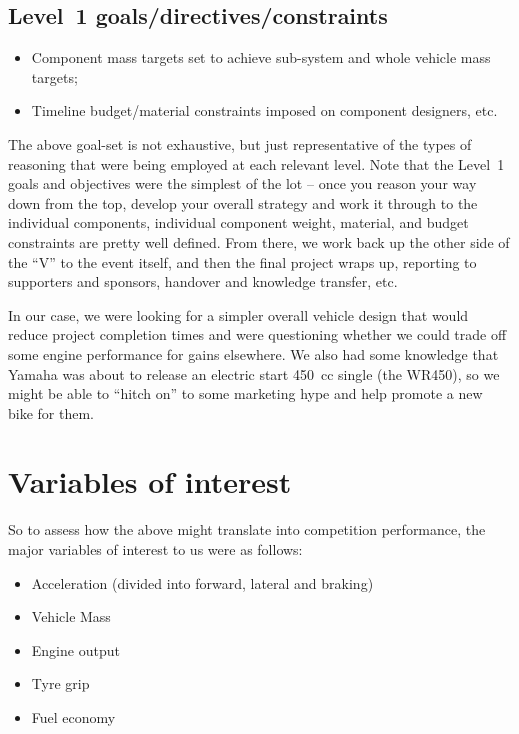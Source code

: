 \documentclass[10pt, a4paper, article, oneside, twocolumn, final]{memoir}
\begin{document}
\subsection*{Level~1 goals/\allowbreak directives/\allowbreak constraints}
\begin{itemize}
    \item Component mass targets set to achieve sub-system and whole vehicle mass targets;
    \item Timeline budget/\allowbreak material constraints imposed on component designers, etc. 
\end{itemize}

The above goal-set is not exhaustive, but just representative of the types of reasoning that were being employed at each relevant level. Note that the Level~1 goals and objectives were the simplest of the lot -- once you reason your way down from the top, develop your overall strategy and work it through to the individual components, individual component weight, material, and budget constraints are pretty well defined. From there, we work back up the other side of the “V” to the event itself, and then the final project wraps up, reporting to supporters and sponsors, handover and knowledge transfer, etc. 

In our case, we were looking for a simpler overall vehicle design that would reduce project completion times and were questioning whether we could trade off some engine performance for gains elsewhere. We also had some knowledge that Yamaha was about to release an electric start \SI{450}{cc} single (the WR450), so we might be able to “hitch on” to some marketing hype and help promote a new bike for them. 

\section*{Variables of interest}

So to assess how the above might translate into competition performance, the major variables of interest to us were as follows: 

\begin{itemize}
    \item Acceleration (divided into forward, lateral and braking)
    \item Vehicle Mass
    \item Engine output
    \item Tyre grip
    \item Fuel economy
\end{itemize}
\end{document}
